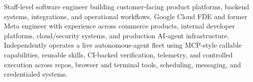 


Staff-level software engineer building customer-facing product platforms, backend systems, integrations, and operational workflows. Google Cloud FDE and former Meta engineer with experience across commerce products, internal developer platforms, cloud/security systems, and production AI-agent infrastructure. Independently operates a live autonomous-agent fleet using MCP-style callable capabilities, reusable skills, CI-backed verification, telemetry, and controlled execution across repos, browser and terminal tools, scheduling, messaging, and credentialed systems.







